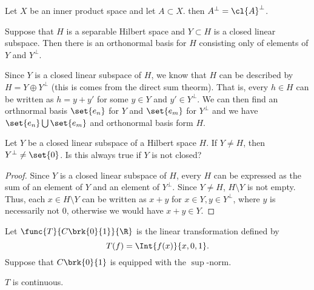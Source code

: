 \documentclass[12pt,letterpaper,twoside]{hmcpset}
\begin{document}
\begin{problem}[4][10]
 Let $X$ be an inner product space and let $A \subset X$. then $A^\perp = \cl{A}^\perp$.
\end{problem}

\begin{problem}[5][10]
 Suppose that $H$ is a separable Hilbert space and $Y \subset H$ is a closed 
linear subspace. Then there is an orthonormal basis for $H$ consisting only of 
elements of $Y$ and $Y^\perp$.
\end{problem}

\begin{solution}
 Since $Y$ is a closed linear subspace of $H$, we know that $H$ can be 
described by $H = Y \oplus Y^\perp$ (this is comes from the direct sum theorm). 
That is, every $h \in H$ can be written as $h = y + y'$ for some $y \in Y$ and 
$y' \in Y^\perp$.  We can then find an orthnormal basis $\set{e_n}$ for $Y$ and 
$\set{e_m}$ for $Y^\perp$ and we have $\set{e_n} \bigcup \set{e_m}$ and 
orthonormal basis form $H$.
\end{solution}



\begin{problem}[6][15]
 Let $Y$ be a closed linear subspace of a Hilbert space $H$. If $Y \neq H$, then $Y^\perp \neq \set{0}$. Is this always true if $Y$ is not closed?
\end{problem}

\begin{solution}
 \begin{proof}
  Since $Y$ is a closed linear subspace of $H$, every $H$ can be expressed as 
the sum of an element of $Y$ and an element of $Y^\perp$. Since $Y \neq H$, $H 
\setminus Y$ is not empty. Thus, each $x \in H\setminus Y$ can be written as 
$x+y$ for $x\in Y, y \in Y^\perp$, where $y$ is necessarily not 0, otherwise we 
would have $x+y \in Y$.
 \end{proof}

\end{solution}


\begin{problem}[7][10]
 Let $\func{T}{C\brk{0}{1}}{\R}$ is the linear transformation defined by
 \[T(f) = \Int{f(x)}{x,0,1}.\]
 Suppose that $C\brk{0}{1}$ is equipped with the $\sup$-norm.
\end{problem}

\begin{problem}[7a]
 $T$ is continuous.
\end{problem}
\end{document}
